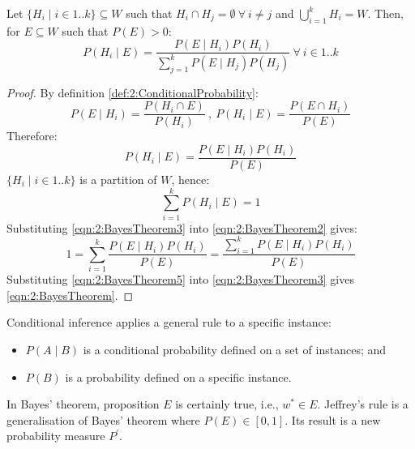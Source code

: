 \begin{thm}
  \label{thm:2:BayesTheorem}

  Let $\{H_i \mid i \in 1 .. k\}\subseteq W$ such that $H_i \cap H_j = \emptyset\
    \forall\ i \neq j$ and $\bigcup_{i = 1}^{k} H_i = W$.
  Then, for $E \subseteq W$ such that $P(E) > 0$:
  \begin{equation}
    \label{eqn:2:BayesTheorem}
    P(H_i \mid E)
    = \frac{P(E \mid H_i)P(H_i)}{\sum_{j = 1}^{k} P(E \mid H_j) P(H_j)}\
    \forall\ i \in 1 .. k
  \end{equation}
  \begin{proof}
    By definition \ref{def:2:ConditionalProbability}:
    \begin{equation}
      \label{eqn:2:BayesTheorem1}
      P(E \mid H_i) = \frac{P(H_i \cap E)}{P(H_i)}\ ,\
      P(H_i \mid E) = \frac{P(E \cap H_i)}{P(E)}
    \end{equation}
    Therefore:
    \begin{equation}
      \label{eqn:2:BayesTheorem2}
      P(H_i \mid E) = \frac{P(E \mid H_i) P(H_i)}{P(E)}
    \end{equation}
    $\{H_i\mid i\in 1 .. k\}$ is a partition of $W$, hence:
    \begin{equation}
      \label{eqn:2:BayesTheorem3}
      \sum_{i = 1}^{k}P(H_i \mid E) = 1
    \end{equation}
    Substituting \ref{eqn:2:BayesTheorem3} into \ref{eqn:2:BayesTheorem2} gives:
    \begin{equation}
      \label{eqn:2:BayesTheorem5}
      1 = \sum_{i = 1}^{k}\frac{P(E \mid H_i)P(H_i)}{P(E)}
      = \frac{\sum_{i = 1}^{k}
        P(E \mid H_i) P(H_i)}{P(E)}
    \end{equation}
    Substituting
    \ref{eqn:2:BayesTheorem5} into \ref{eqn:2:BayesTheorem3} gives
    \ref{eqn:2:BayesTheorem}.
  \end{proof}
\end{thm}

Conditional inference applies a general rule to a specific instance:
\begin{itemize}
  \item $P(A \mid B)$ is a conditional probability defined on a set of instances; and
  \item $P(B)$ is a probability defined on a specific instance.
\end{itemize}

In Bayes' theorem, proposition $E$ is certainly true, i.e., $w^* \in E$.
Jeffrey's rule is a generalisation of Bayes' theorem where $P(E) \in [0, 1]$.
Its result is a new probability measure $P^\prime$.

